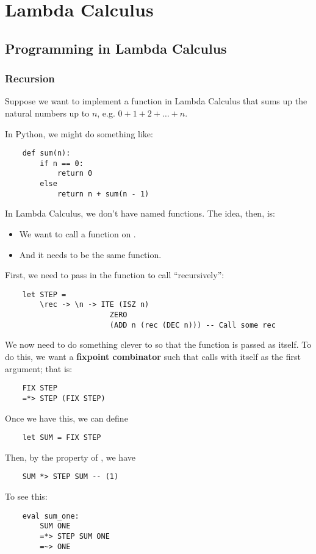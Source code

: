 \documentclass[letterpaper]{article}
\begin{document}
\section{Lambda Calculus}
\subsection{Programming in Lambda Calculus}
\subsubsection{Recursion}
Suppose we want to implement a function in Lambda Calculus that sums up the natural numbers up to $n$, e.g. $0 + 1 + 2 + \dots + n$.

\bigskip 

In Python, we might do something like: 
\begin{verbatim}
    def sum(n):
        if n == 0:
            return 0
        else 
            return n + sum(n - 1)
\end{verbatim}
In Lambda Calculus, we don't have named functions. The idea, then, is: 
\begin{itemize}
    \item We want to call a function on .
    \item And it needs to be the same function.
\end{itemize}
First, we need to pass in the function to call ``recursively'':
\begin{verbatim}
    let STEP = 
        \rec -> \n -> ITE (ISZ n)
                        ZERO 
                        (ADD n (rec (DEC n))) -- Call some rec 
\end{verbatim}
We now need to do something clever to  so that the function is passed as  itself. To do this, we want a \textbf{fixpoint combinator}  such that  calls  with itself as the first argument; that is: 
\begin{verbatim}
    FIX STEP 
    =*> STEP (FIX STEP)
\end{verbatim}
Once we have this, we can define 
\begin{verbatim}
    let SUM = FIX STEP 
\end{verbatim}
Then, by the property of , we have 
\begin{verbatim}
    SUM *> STEP SUM -- (1)
\end{verbatim}
To see this: 
\begin{verbatim}
    eval sum_one: 
        SUM ONE 
        =*> STEP SUM ONE 
        =~> ONE 
\end{verbatim}
\end{document}
